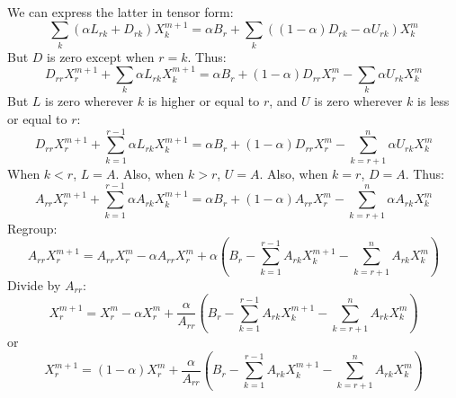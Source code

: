 \documentclass{warpdoc}
\begin{document}
We can express the latter in tensor form:
%
\begin{equation}
\sum_{k} (\alpha L_{rk} + D_{rk}) X_k^{m+1} = \alpha B_r + \sum_k\left((1-\alpha)D_{rk} - \alpha U_{rk} \right)X_k^m
\end{equation}
%
But $D$ is zero except when $r=k$. Thus:
%
\begin{equation}
D_{rr} X_r^{m+1} + \sum_{k} \alpha L_{rk}  X_k^{m+1} = \alpha B_r + (1-\alpha)D_{rr}X_r^m - \sum_k \alpha U_{rk} X_k^m 
\end{equation}
%
But $L$ is zero wherever $k$ is higher or equal to $r$, and $U$ is zero wherever $k$ is less or equal to $r$:
%
\begin{equation}
D_{rr} X_r^{m+1} + \sum_{k=1}^{r-1} \alpha L_{rk}  X_k^{m+1} = \alpha B_r + (1-\alpha)D_{rr}X_r^m - \sum_{k=r+1}^{n} \alpha U_{rk} X_k^m 
\end{equation}
%
When $k<r$, $L=A$. Also, when $k>r$, $U=A$. Also, when $k=r$, $D=A$. Thus:
%
\begin{equation}
A_{rr} X_r^{m+1} + \sum_{k=1}^{r-1} \alpha A_{rk}  X_k^{m+1} = \alpha B_r + (1-\alpha)A_{rr}X_r^m - \sum_{k=r+1}^{n} \alpha A_{rk} X_k^m 
\end{equation}
%
Regroup:
%
\begin{equation}
A_{rr} X_r^{m+1} = A_{rr}X_r^m -  \alpha A_{rr}X_r^m + \alpha\left(B_r - \sum_{k=1}^{r-1}  A_{rk}  X_k^{m+1}    - \sum_{k=r+1}^{n}  A_{rk} X_k^m \right)
\end{equation}
%
Divide by $A_{rr}$:
%
\begin{equation}
 X_r^{m+1} = X_r^m -  \alpha X_r^m + \frac{\alpha}{A_{rr}}\left(B_r - \sum_{k=1}^{r-1}  A_{rk}  X_k^{m+1}    - \sum_{k=r+1}^{n}  A_{rk} X_k^m \right)
\end{equation}
%
or
%
\begin{equation}
 X_r^{m+1} = (1-\alpha) X_r^m  + \frac{\alpha}{A_{rr}}\left(B_r - \sum_{k=1}^{r-1}  A_{rk}  X_k^{m+1}    - \sum_{k=r+1}^{n}  A_{rk} X_k^m \right)
\end{equation}
%
 

  
  
\end{document}
